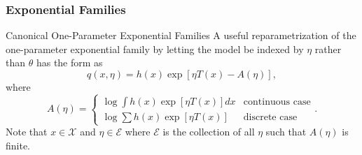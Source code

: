 \documentclass[serif,mathserif,professionalfont]{beamer}
\begin{document}
\begin{frame}
	
	\frametitle{Exponential Families}
	
	\begin{block}{Canonical One-Parameter Exponential Families}
		A useful reparametrization of the one-parameter exponential family by letting the model be indexed by $ \eta $ rather than $ \theta $ has the form as
		\begin{equation*}
		q\left(x, \eta \right) = h\left(x \right) \exp \left[\eta T\left(x \right) - A\left(\eta \right) \right],
		\end{equation*}
		where
		\begin{equation*}
		A\left(\eta \right) = 
		\begin{cases}
		\displaystyle \log \int h\left(x \right) \exp \left[\eta T\left(x \right) \right] dx  & \text{continuous case} \\
		\displaystyle \log \sum h\left(x \right) \exp \left[\eta T\left(x \right) \right]  & \text{discrete case}
		\end{cases}.
		\end{equation*}
		Note that $ x \in \mathcal{X} $ and $ \eta \in \mathcal{E} $ where $ \mathcal{E} $ is the collection of all $ \eta $ such that $ A\left(\eta \right) $ is finite.
	\end{block}

\end{frame}
\end{document}
